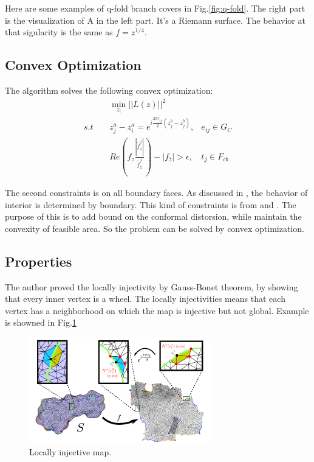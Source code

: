 \documentclass[fleqn,10pt]{wlscirep}
\begin{document}
Here are some examples of q-fold branch covers in Fig.\ref{fig:q-fold}. The right part is the visualization of A in the left part. It's a Riemann surface. The behavior at that sigularity is the same as $f = z^{1/4}$.

\subsection{Convex Optimization}

The algorithm solves the following convex optimization:
\begin{equation}
\begin{split}
&\min_{z_i} ||L(z)||^2&\\
s.t\  \ \ \ \  & z^a_{j}-z^a_i=e^{i\frac{2\pi r_{ij}}{q} (z^b_j-z^b_j)}, &e_{ij}\in G_C\\
&Re(f_z \frac{|\tilde{f}_z^j|}{\tilde{f}_z^j}) - |f_{\bar{z}}| > \epsilon , &t_j \in F_{cb}
\end{split}
\end{equation}

The second constraints is on all boundary faces. As discussed in \cite{Gortler:2006:DOM:1133946.1648437}, the behavior of interior is determined by boundary. This kind of constraints is from \cite{Lipman:2012:BDM:2185520.2185604} and \cite{Chen:2015:BDH:2809654.2766989}. The purpose of this is to add bound on the conformal distorsion, while maintain the convexity of feasible area. So the problem can be solved by convex optimization. 



\subsection{Properties}

The author proved the locally injectivity by Gauss-Bonet theorem, by showing that every inner vertex is a wheel.  The locally injectivities means that each vertex has a neighborhood on which the map is injective but not global. Example is showned in Fig.\ref{fig:locally-injectivity}

\begin{figure}
\centering
\includegraphics[width=0.7\textwidth]{images/locally}
\caption{Locally injective map.}
\label{fig:locally-injectivity}
\end{figure}
\end{document}

